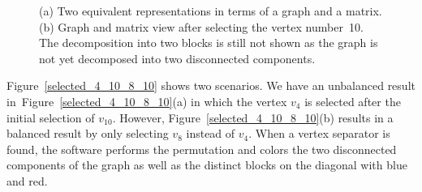 \documentclass[12pt, twoside,a4paper,toc=bibliography]{scrbook}
\newcommand{\figref}[1]{Figure~\protect\ref{#1}}
\begin{document}
\begin{figure}
\centering
{}
\hfill
{}
\caption{
(a) Two equivalent representations in terms of a graph and a matrix.
(b) Graph and matrix view after selecting the vertex number~10.
The decomposition into two blocks is still not shown as the graph is not yet
decomposed into two disconnected components.}
\label{initial_10}
\end{figure}

Figure~\ref{selected_4_10_8_10} shows two scenarios.
We have an unbalanced result in~\figref{selected_4_10_8_10}(a)
in which the vertex $v_4$ is selected after the initial selection of $v_{10}$.
However, \figref{selected_4_10_8_10}(b) results in a balanced result
by only selecting $v_8$ instead of $v_4$.
When a vertex separator is found,
the software performs the permutation
and colors the two disconnected components of the graph
as well as the distinct blocks on the diagonal with blue and red.
\end{document}
